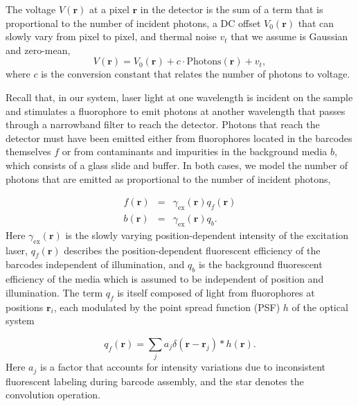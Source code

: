 The voltage $V(\mathbf{r})$ at a pixel $\mathbf{r}$ in the detector is the sum of a term that is proportional to the number of incident photons, a DC offset $V_0(\mathbf{r})$ that can slowly vary from pixel to pixel, and thermal noise $v_t$ that we assume is Gaussian and zero-mean,
\begin{equation}\label{eq:V_of_r}
V(\mathbf{r})=V_0(\mathbf{r})+c \cdot \text{Photons}(\mathbf{r}) +v_t,
\end{equation}
where $c$ is the conversion constant that relates the number of photons to voltage. 


Recall that, in our system, laser light at one wavelength is incident on the sample and stimulates a fluorophore to emit photons at another wavelength that passes through a narrowband filter to reach the detector. Photons that reach the detector must have been emitted either from fluorophores located  in the barcodes themselves $f$ or from contaminants and impurities in the background media $b$, which consists of a glass slide and buffer.  In both cases, we model the number of photons that are emitted as proportional to the number of incident photons, 

\begin{eqnarray}\label{eq:f_and_b}
f(\mathbf{r})&=&\gamma_{\text{ex}}(\mathbf{r}) q_f(\mathbf{r})\\
b(\mathbf{r})&=&\gamma_{\text{ex}}(\mathbf{r}) q_b.
\end{eqnarray}
Here $\gamma_{\text{ex}}(\mathbf{r})$ is the slowly varying position-dependent intensity of the excitation laser,  $q_f(\mathbf{r})$ describes the position-dependent fluorescent efficiency of the barcodes independent of illumination, and $q_b$ is the background fluorescent efficiency of the media which is assumed to be independent of position and illumination. The term $q_f$ is itself composed of light from fluorophores at positions $\mathbf{r}_i$, each modulated by the point spread function (PSF) $h$ of the optical system

\begin{equation} \label{eq:withPSF}
q_f(\mathbf{r})=\sum_j a_j \delta(\mathbf{r}-\mathbf{r}_j) * h(\mathbf{r}).
\end{equation}
Here $a_j$ is a factor that accounts for intensity variations due to inconsistent fluorescent labeling  during barcode assembly, and the star denotes the convolution operation.


